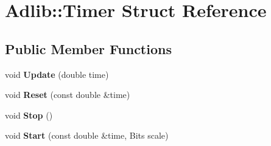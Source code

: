 \hypertarget{structAdlib_1_1Timer}{\section{Adlib\-:\-:Timer Struct Reference}
\label{structAdlib_1_1Timer}
}
\subsection*{Public Member Functions}
\begin{DoxyCompactItemize}
\item 
\hypertarget{structAdlib_1_1Timer_aa0f05e7b2b102f1f9e8a9fb6571d0d14}{void {\bfseries Update} (double time)}\label{structAdlib_1_1Timer_aa0f05e7b2b102f1f9e8a9fb6571d0d14}

\item 
\hypertarget{structAdlib_1_1Timer_afcf7700454498af7004a09165696f07d}{void {\bfseries Reset} (const double \&time)}\label{structAdlib_1_1Timer_afcf7700454498af7004a09165696f07d}

\item 
\hypertarget{structAdlib_1_1Timer_abaa9e04459e2e7a380f603b5ae33a466}{void {\bfseries Stop} ()}\label{structAdlib_1_1Timer_abaa9e04459e2e7a380f603b5ae33a466}

\item 
\hypertarget{structAdlib_1_1Timer_a4b212bfd359c59b4f79645b32894828d}{void {\bfseries Start} (const double \&time, Bits scale)}\label{structAdlib_1_1Timer_a4b212bfd359c59b4f79645b32894828d}

\end{DoxyCompactItemize}
